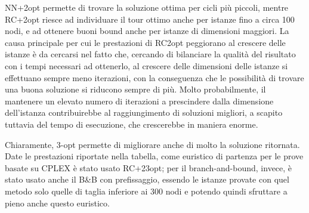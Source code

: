 NN+2opt permette di trovare la soluzione ottima per cicli più piccoli, mentre RC+2opt riesce ad individuare il tour ottimo anche per istanze fino a circa 100 nodi, e ad ottenere buoni bound anche per istanze di dimensioni maggiori. La causa principale per cui le prestazioni di RC2opt peggiorano al crescere delle istanze è da cercarsi nel fatto che, cercando di bilanciare la qualità del risultato con i tempi necessari ad ottenerlo, al crescere delle dimensioni delle istanze si effettuano sempre meno iterazioni, con la conseguenza che le possibilità di trovare una buona soluzione si riducono sempre di più. Molto probabilmente, il mantenere un elevato numero di iterazioni a prescindere dalla dimensione dell’istanza contribuirebbe al raggiungimento di soluzioni migliori, a scapito tuttavia del tempo di esecuzione, che crescerebbe in maniera enorme.

Chiaramente, 3-opt permette di migliorare anche di molto la soluzione ritornata. Date le prestazioni riportate nella tabella, come euristico di partenza per le prove basate su CPLEX è stato usato RC+23opt; per il branch-and-bound, invece, è stato usato anche il B\&B con prefissaggio, essendo le istanze provate con quel metodo solo quelle di taglia inferiore ai 300 nodi e potendo quindi sfruttare a pieno anche questo euristico.

